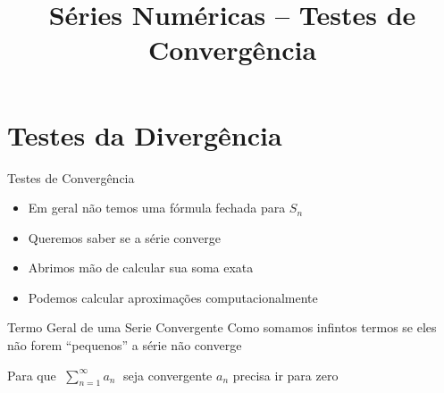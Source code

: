 
\usepackage{integracao_e_series}
\usepackage{cancel}

\title{Séries Numéricas -- Testes de Convergência}



  \addtitle

\section{Testes da Divergência}

\begin{frame}{Testes de Convergência}
  \begin{itemize}[<+->]
    \item Em geral não temos uma fórmula fechada para $S_n$ \\[2mm]
    \item Queremos saber se a série converge \\[2mm]
    \item Abrimos mão de calcular sua soma exata \\[2mm]
    \item Podemos calcular aproximações computacionalmente
  \end{itemize}
\end{frame}

\begin{frame}{Termo Geral de uma Serie Convergente}
  Como somamos infintos termos se eles não forem ``pequenos'' a série não converge

  \pause
  \vspace{\baselineskip}
  Para que \(\;\sum_{n=1}^\infty a_n\;\) seja convergente $a_n$ precisa ir para zero
\end{frame}

